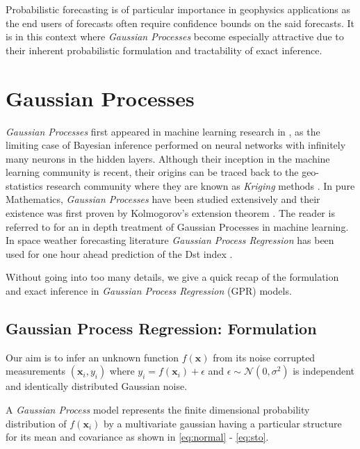 \documentclass{article}
\begin{document}
Probabilistic forecasting is of particular importance in geophysics
applications as the end users of forecasts often require confidence
bounds on the said forecasts. It is in this context where
\emph{Gaussian Processes} become especially attractive due to their
inherent probabilistic formulation and tractability of exact inference.


\section{Gaussian Processes}

\emph{Gaussian Processes} first appeared in machine learning research
in \citet{Neal:1996:BLN:525544}, as the limiting case of Bayesian
inference performed on neural networks with infinitely many neurons in
the hidden layers. Although their inception in the machine learning
community is recent, their origins can be traced back to the
geo-statistics research community where they are known as
\emph{Kriging} methods \citep{krige1951statistical}. In pure
Mathematics, \emph{Gaussian Processes} have been studied extensively
and their existence was first proven by Kolmogorov's extension theorem
\citep{tao2011introduction}. The reader is referred to
\citet{Rasmussen:2005:GPM:1162254} for an in depth treatment of
Gaussian Processes in machine learning. In space weather forecasting
literature \emph{Gaussian Process Regression} has been used for one
hour ahead prediction of the Dst index \citep{SWE:SWE20479}.

Without going into too many details, we give a quick recap of the
formulation and exact inference in \emph{Gaussian Process Regression} (GPR) models. 

\subsection{Gaussian Process Regression: Formulation}

Our aim is to infer an unknown function $f(\mathbf{x})$ from its noise
corrupted measurements $(\mathbf{x}_i, y_i)$ where $y_i =
f(\mathbf{x}_i) + \epsilon$ and $\epsilon \sim \mathcal{N}(0,
\sigma^2)$ is independent and identically distributed Gaussian noise.

A \emph{Gaussian Process} model represents the finite dimensional
probability distribution of $f(\mathbf{x}_i)$ by a multivariate
gaussian having a particular structure for its mean and covariance as
shown in \ref{eq:normal} - \ref{eq:sto}.
\end{document}
